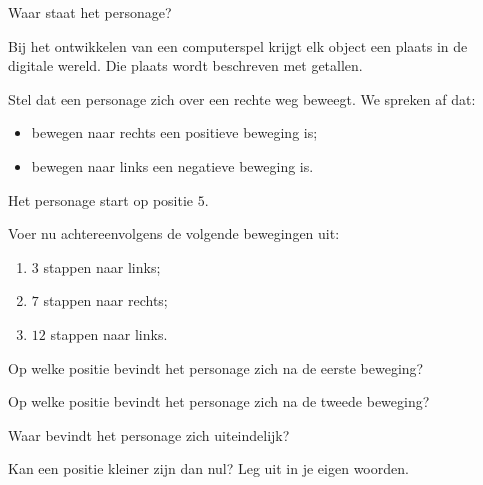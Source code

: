\documentclass{ximera}
\begin{document}
\begin{exploration}{Waar staat het personage?}

Bij het ontwikkelen van een computerspel krijgt elk object een plaats
in de digitale wereld. Die plaats wordt beschreven met getallen.

Stel dat een personage zich over een rechte weg beweegt. We spreken af dat:

\begin{itemize}
  \item bewegen naar rechts een positieve beweging is;
  \item bewegen naar links een negatieve beweging is.
\end{itemize}

Het personage start op positie \(5\).


Voer nu achtereenvolgens de volgende bewegingen uit:

\begin{enumerate}
  \item \(3\) stappen naar links;
  \item \(7\) stappen naar rechts;
  \item \(12\) stappen naar links.
\end{enumerate}

\begin{question}
Op welke positie bevindt het personage zich na de eerste beweging?
\end{question}

\begin{question}
Op welke positie bevindt het personage zich na de tweede beweging?
\end{question}

\begin{question}
Waar bevindt het personage zich uiteindelijk?
\end{question}

\begin{question}
Kan een positie kleiner zijn dan nul? Leg uit in je eigen woorden.
\end{question}

\end{exploration}


\end{document}
